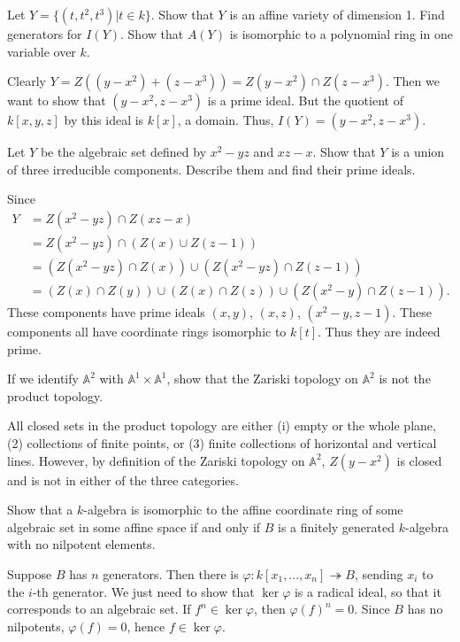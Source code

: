 \begin{questions}
\question Let $Y = \{ (t, t^2, t^3) | t \in k\}$. Show that $Y$ is an affine
variety of dimension 1. Find generators for $I(Y)$. Show that $A(Y)$ is
isomorphic to a polynomial ring in one variable over $k$.
\begin{solution}
Clearly $Y = Z((y - x^2) + (z - x^3)) = Z(y - x^2) \cap Z(z - x^3)$. Then we
want to show that $(y - x^2, z - x^3)$ is a prime ideal. But the quotient of $k
[x,y,z]$ by this ideal is $k[x]$, a domain. Thus, $I(Y) = (y - x^2, z - x^3)$.
\end{solution}

\question Let $Y$ be the algebraic set defined by $x^2 - yz$ and $xz - x$. Show
that $Y$ is a union of three irreducible components. Describe them and find
their prime ideals.
\begin{solution}
Since \begin{align*}
Y & = Z(x^2 - yz) \cap Z(xz - x) \\
& = Z(x^2 - yz) \cap (Z(x) \cup Z(z - 1)) \\
& = (Z(x^2 - yz) \cap Z(x)) \cup (Z(x^2 - yz) \cap Z(z - 1)) \\
& = (Z(x) \cap Z(y)) \cup (Z(x) \cap Z(z)) \cup (Z(x^2 - y) \cap Z(z - 1)).
\end{align*}
These components have prime ideals $(x, y)$, $(x, z)$, $(x^2 - y, z - 1)$. These
components all have coordinate rings isomorphic to $k[t]$. Thus they are
indeed prime.
\end{solution}

\question If we identify $\mathbb{A}^2$ with $\mathbb{A}^1 \times \mathbb{A}^1$,
show that the Zariski topology on $\mathbb{A}^2$ is not the product topology.
\begin{solution}
All closed sets in the product topology are either (i) empty or the whole plane,
(2) collections of finite points, or (3) finite collections of horizontal and
vertical lines. However, by definition of the Zariski topology on $\mathbb
{A}^2$, $Z(y - x^2)$ is closed and is not in either of the three categories.
\end{solution}

\question Show that a $k$-algebra is isomorphic to the affine coordinate ring of
some algebraic set in some affine space if and only if $B$ is a finitely
generated $k$-algebra with no nilpotent elements.
\begin{solution}
Suppose $B$ has $n$ generators. Then there is $\varphi: k[x_1, ..., x_n]
\twoheadrightarrow B$, sending $x_i$ to the $i$-th generator. We just need to
show that $\ker \varphi$ is a radical ideal, so that it corresponds to an
algebraic set. If $f^n \in \ker \varphi$, then $\varphi(f)^n = 0$. Since $B$ has
no nilpotents, $\varphi(f) = 0$, hence $f \in \ker \varphi$.
\end{solution}


\end{questions}
